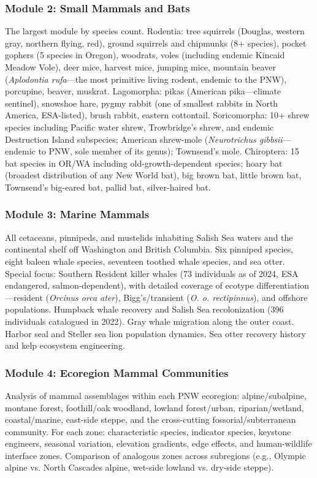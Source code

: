 \documentclass[11pt,letterpaper]{article}
\begin{document}
\subsubsection{Module 2: Small Mammals and Bats}
The largest module by species count. Rodentia: tree squirrels (Douglas, western gray, northern flying, red), ground squirrels and chipmunks (8+ species), pocket gophers (5 species in Oregon), woodrats, voles (including endemic Kincaid Meadow Vole), deer mice, harvest mice, jumping mice, mountain beaver (\textit{Aplodontia rufa}---the most primitive living rodent, endemic to the PNW), porcupine, beaver, muskrat. Lagomorpha: pikas (American pika---climate sentinel), snowshoe hare, pygmy rabbit (one of smallest rabbits in North America, ESA-listed), brush rabbit, eastern cottontail. Soricomorpha: 10+ shrew species including Pacific water shrew, Trowbridge's shrew, and endemic Destruction Island subspecies; American shrew-mole (\textit{Neurotrichus gibbsii}---endemic to PNW, sole member of its genus); Townsend's mole. Chiroptera: 15 bat species in OR/WA including old-growth-dependent species; hoary bat (broadest distribution of any New World bat), big brown bat, little brown bat, Townsend's big-eared bat, pallid bat, silver-haired bat.

\subsubsection{Module 3: Marine Mammals}
All cetaceans, pinnipeds, and mustelids inhabiting Salish Sea waters and the continental shelf off Washington and British Columbia. Six pinniped species, eight baleen whale species, seventeen toothed whale species, and sea otter. Special focus: Southern Resident killer whales (73 individuals as of 2024, ESA endangered, salmon-dependent), with detailed coverage of ecotype differentiation---resident (\textit{Orcinus orca ater}), Bigg's/transient (\textit{O. o. rectipinnus}), and offshore populations. Humpback whale recovery and Salish Sea recolonization (396 individuals catalogued in 2022). Gray whale migration along the outer coast. Harbor seal and Steller sea lion population dynamics. Sea otter recovery history and kelp ecosystem engineering.

\subsubsection{Module 4: Ecoregion Mammal Communities}
Analysis of mammal assemblages within each PNW ecoregion: alpine/subalpine, montane forest, foothill/oak woodland, lowland forest/urban, riparian/wetland, coastal/marine, east-side steppe, and the cross-cutting fossorial/subterranean community. For each zone: characteristic species, indicator species, keystone engineers, seasonal variation, elevation gradients, edge effects, and human-wildlife interface zones. Comparison of analogous zones across subregions (e.g., Olympic alpine vs. North Cascades alpine, wet-side lowland vs. dry-side steppe).
\end{document}
